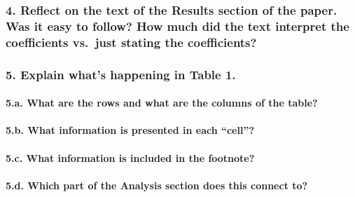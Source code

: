 \documentclass[]{article}
\let\oldparagraph\paragraph
\renewcommand{\paragraph}[1]{\oldparagraph{#1}\mbox{}}
\begin{document}
\hypertarget{reflect-on-the-text-of-the-results-section-of-the-paper.-was-it-easy-to-follow-how-much-did-the-text-interpret-the-coefficients-vs.just-stating-the-coefficients}{%
\subsubsection{\texorpdfstring{4. Reflect on the text of the
\textbf{Results} section of the paper. Was it easy to follow? How much
did the text interpret the coefficients vs.~just stating the
coefficients?}{4. Reflect on the text of the Results section of the paper. Was it easy to follow? How much did the text interpret the coefficients vs.~just stating the coefficients?}}\label{reflect-on-the-text-of-the-results-section-of-the-paper.-was-it-easy-to-follow-how-much-did-the-text-interpret-the-coefficients-vs.just-stating-the-coefficients}}

\hypertarget{explain-whats-happening-in-table-1.}{%
\subsubsection{5. Explain what's happening in Table
1.}\label{explain-whats-happening-in-table-1.}}

\hypertarget{a.-what-are-the-rows-and-what-are-the-columns-of-the-table}{%
\paragraph{5.a. What are the rows and what are the columns of the
table?}\label{a.-what-are-the-rows-and-what-are-the-columns-of-the-table}}

\hypertarget{b.-what-information-is-presented-in-each-cell}{%
\paragraph{5.b. What information is presented in each
``cell''?}\label{b.-what-information-is-presented-in-each-cell}}

\hypertarget{c.-what-information-is-included-in-the-footnote}{%
\paragraph{5.c. What information is included in the
footnote?}\label{c.-what-information-is-included-in-the-footnote}}

\hypertarget{d.-which-part-of-the-analysis-section-does-this-connect-to}{%
\paragraph{5.d. Which part of the Analysis section does this connect
to?}\label{d.-which-part-of-the-analysis-section-does-this-connect-to}}
\end{document}
